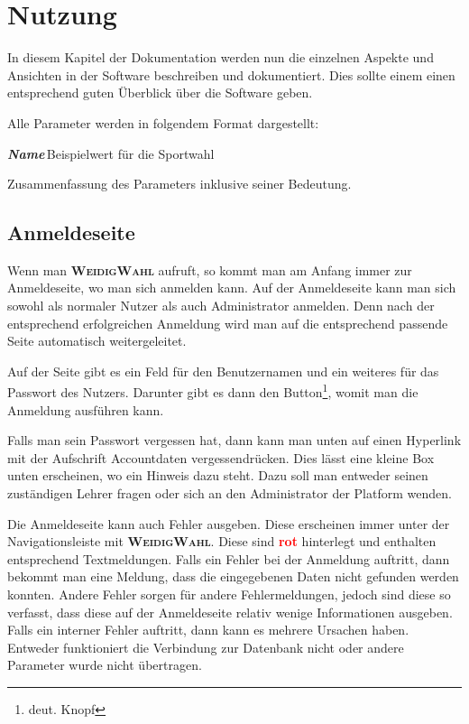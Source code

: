 \documentclass[ngerman]{ltxdoc}
\newcommand{\DescribeOption}[4]{
  \DescribeMacro{#1}
  \begin{minipage}[t]{\textwidth}
    \textit{\textbf{\textcolor{mLightGreen}{#2}}}\dotfill\,#3\par
    \begingroup
    \vspace{0.5em}#4\par
    \endgroup
  \end{minipage}
}
\newcommand{\name}{\textbf{\textsc{WeidigWahl}}\xspace}
\begin{document}
\section{Nutzung}

In diesem Kapitel der Dokumentation werden nun die einzelnen Aspekte und Ansichten
in der Software beschreiben und dokumentiert. Dies sollte einem einen entsprechend
guten Überblick über die Software geben.

Alle Parameter werden in folgendem Format dargestellt:

\DescribeOption{Stichwort}{Name}{Beispielwert für die Sportwahl}{
  Zusammenfassung des Parameters inklusive seiner Bedeutung.
}

\subsection{Anmeldeseite}

Wenn man \name aufruft, so kommt man am Anfang immer zur Anmeldeseite, wo man sich
anmelden kann. Auf der Anmeldeseite kann man sich sowohl als normaler Nutzer als
auch Administrator anmelden. Denn nach der entsprechend erfolgreichen Anmeldung
wird man auf die entsprechend passende Seite automatisch weitergeleitet.

Auf der Seite gibt es ein Feld für den Benutzernamen und ein weiteres für das
Passwort des Nutzers. Darunter gibt es dann den Button\footnote{deut. Knopf}, womit
man die Anmeldung ausführen kann.

Falls man sein Passwort vergessen hat, dann kann man unten auf einen Hyperlink
mit der Aufschrift \glqq Accountdaten vergessen\grqq drücken. Dies lässt eine kleine
Box unten erscheinen, wo ein Hinweis dazu steht. Dazu soll man entweder seinen
zuständigen Lehrer fragen oder sich an den Administrator der Platform wenden.

Die Anmeldeseite kann auch Fehler ausgeben. Diese erscheinen immer unter der
Navigationsleiste mit \name. Diese sind \textcolor{red}{\textbf{rot}} hinterlegt
und enthalten entsprechend Textmeldungen. Falls ein Fehler bei der Anmeldung auftritt,
dann bekommt man eine Meldung, dass die eingegebenen Daten nicht gefunden werden konnten.
Andere Fehler sorgen für andere Fehlermeldungen, jedoch sind diese so verfasst,
dass diese auf der Anmeldeseite relativ wenige Informationen ausgeben. Falls ein
interner Fehler auftritt, dann kann es mehrere Ursachen haben. Entweder funktioniert
die Verbindung zur Datenbank nicht oder andere Parameter wurde nicht übertragen.
\end{document}
